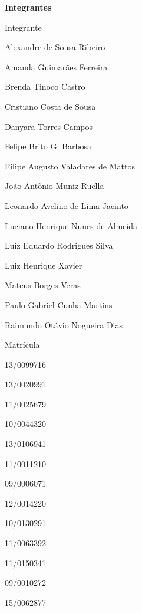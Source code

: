 \begin{folhadeaprovacao}

  \begin{center}
    {\ABNTEXchapterfont\large\imprimirautor}
    \vspace*{1,5cm}

    {\ABNTEXchapterfont\bfseries\Large{Integrantes}}
    \vspace*{1,5cm}
  \end{center}

\begin{minipage}[b]{.5\textwidth}
Integrante \vspace{2mm}

Alexandre de Sousa Ribeiro

Amanda Guimarães Ferreira

Brenda Tinoco Castro

Cristiano Costa de Sousa

Danyara Torres Campos

Felipe Brito G. Barbosa

Filipe Augusto Valadares de Mattos

João Antônio Muniz Ruella

Leonardo Avelino de Lima Jacinto

Luciano Henrique Nunes de Almeida

Luiz Eduardo Rodrigues Silva

Luiz Henrique Xavier

Mateus Borges Veras

Paulo Gabriel Cunha Martins

Raimundo Otávio Nogueira Dias
\end{minipage}
\hspace{\fill}
\begin{minipage}[b]{.15\textwidth}
Matrícula \vspace{2mm}

13/0099716

13/0020991

11/0025679

10/0044320

13/0106941

11/0011210

09/0006071

12/0014220

10/0130291

11/0063392

11/0150341

09/0010272

15/0062877


\end{minipage}
\end{folhadeaprovacao}
